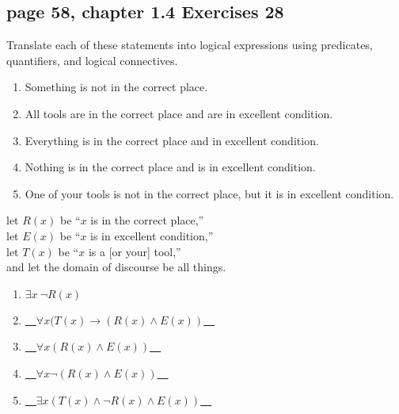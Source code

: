 \documentclass[sigconf]{acmart}
\begin{document}
\subsection{page 58, chapter 1.4 Exercises 28}
\begin{shaded}
    Translate each of these statements into logical expressions using predicates, quantifiers, and logical connectives.
    \begin{enumerate}[label=(\alph*)]
        \item Something is not in the correct place.
        \item All tools are in the correct place and are in excellent
        condition.
        \item Everything is in the correct place and in excellent
        condition.
        \item Nothing is in the correct place and is in excellent condition.
        \item One of your tools is not in the correct place, but it is
        in excellent condition.
    \end{enumerate}
\end{shaded} 
let $R(x)$ be “$x$ is in the correct place,”\\
let $E(x)$ be “$x$ is in excellent condition,”\\
let $T(x)$ be “$x$ is a [or your] tool,”\\ and let the domain of discourse be all things.
\begin{enumerate}[label=(\alph*)]
	\item $\exists x ~ \neg R(x)$
	\item \underline{~~$\forall x (T(x) \rightarrow (R(x) \land E(x))$~~}
	\item \underline{~~$\forall x (R(x) \land E(x))$~~}
	\item \underline{~~$\forall x \neg (R(x) \land E(x))$~~}
	\item \underline{~~$\exists x(T(x) \land \neg R(x) \land E(x))$~~}
\end{enumerate}
\end{document}
